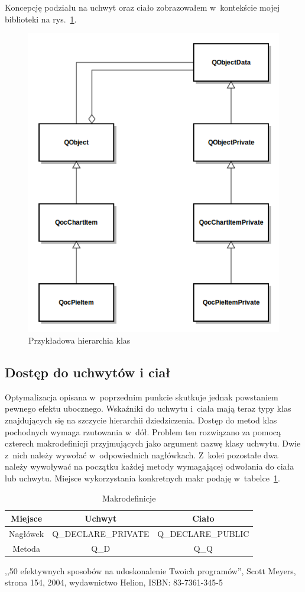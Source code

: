 \documentclass[11pt,twoside,a4paper,final]{llncs}
\begin{document}
Koncepcję podziału na uchwyt oraz ciało zobrazowałem w~kontekście mojej biblioteki na rys.~\ref{rys:dpointer}.
\begin{figure}
\centering
\caption{Przykładowa hierarchia klas}\label{rys:dpointer}
\includegraphics[scale=0.6]{dpointer.png}
\end{figure}

\subsection{Dostęp do uchwytów i ciał}
Optymalizacja opisana w~poprzednim punkcie skutkuje jednak powstaniem pewnego efektu ubocznego.
Wskaźniki do uchwytu i~ciała mają teraz typy klas znajdujących się na szczycie hierarchii dziedziczenia. Dostęp do metod klas pochodnych wymaga rzutowania w~dół. 
Problem ten rozwiązano za pomocą czterech makrodefinicji przyjmujących jako argument nazwę klasy uchwytu. Dwie z~nich należy wywołać w~odpowiednich nagłówkach. Z~kolei pozostałe dwa należy wywoływać na początku każdej metody wymagającej odwołania do ciała lub uchwytu. Miejsce wykorzystania konkretnych makr podaję w~tabelce~\ref{tab:makra}.

\begin{table}[h]\footnotesize
\centering
\caption{Makrodefinicje}
\label{tab:makra}
\begin{tabular}{|c|c|c|}
\hline
Miejsce & Uchwyt & Ciało\\
\hline
Nagłówek & Q\_DECLARE\_PRIVATE & Q\_DECLARE\_PUBLIC\\
\hline
Metoda & Q\_D & Q\_Q\\
\hline
\end{tabular}
\end{table}

\begin{thebibliography}{}
,,50 efektywnych sposobów na udoskonalenie Twoich programów'', Scott Meyers, strona 154, 2004, wydawnictwo Helion, ISBN: 83-7361-345-5


\end{thebibliography}
\end{document}
